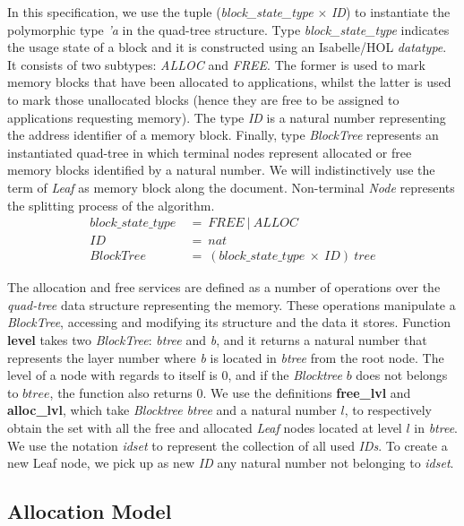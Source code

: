 In this specification, we use the tuple (\emph{block\_state\_type} $\times$ \emph{ID}) to instantiate the polymorphic type \emph{'a} in the quad-tree structure. Type \emph{block\_state\_type} indicates the usage state of a block and it is constructed using an Isabelle/HOL \emph{datatype}. It consists of two subtypes: \emph{ALLOC} and \emph{FREE}. The former is used to mark memory blocks that have been allocated to applications, whilst the latter is used to mark those unallocated blocks (hence they are free to be assigned to applications requesting memory). The type \emph{ID} is a natural number representing the address identifier of a memory block. Finally, type \emph{BlockTree} represents an instantiated quad-tree in which terminal nodes represent allocated or free memory blocks identified by a natural number. We will indistinctively use the term of \emph{Leaf} as memory block along the document. Non-terminal \emph{Node} represents the splitting process of the algorithm.
\begin{align*}
block\_state\_type\ &=\ FREE\ |\ ALLOC \\
ID\ &=\ nat \\
BlockTree\ &=\ (block\_state\_type\ \times\ ID)\ tree
\end{align*}

The allocation and free services are defined as a number of operations over the \emph{quad-tree} data structure representing the memory. These operations manipulate a \textsl{BlockTree}, accessing and modifying its structure and the data it stores. Function \textbf{level} takes two \emph{BlockTree}: \emph{btree} and \emph{b}, and it returns a natural number that represents the layer number where \emph{b} is located in \emph{btree} from the root node. The level of a node with regards to itself is $0$, and if the \emph{Blocktree} $b$ does not belongs to $btree$, the function also returns $0$. We use the definitions \textbf{free\_lvl} and \textbf{alloc\_lvl}, which take \emph{Blocktree} \emph{btree} and a natural number $l$, to respectively obtain the set with all the free and allocated \emph{Leaf} nodes located at level $l$ in \emph{btree}. We use the notation \emph{idset} to represent the collection of all used \emph{IDs}. To create a new Leaf node, we pick up as new \emph{ID} any natural number not belonging to \emph{idset}.

\subsection{Allocation Model}

